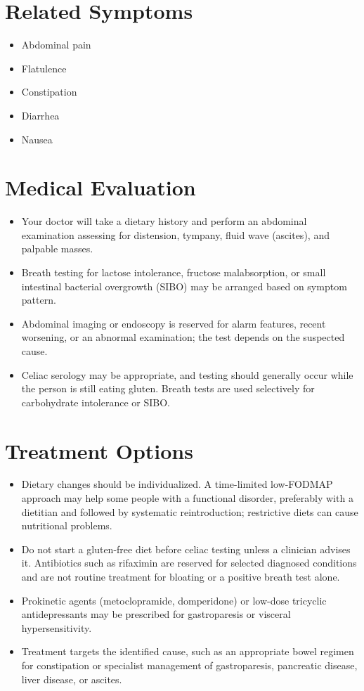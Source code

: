 \section*{Related Symptoms}
\begin{itemize}
 \item Abdominal pain
 \item Flatulence
 \item Constipation
 \item Diarrhea
 \item Nausea
\end{itemize}

\section*{Medical Evaluation}
\begin{itemize}
 \item Your doctor will take a dietary history and perform an abdominal examination assessing for distension, tympany, fluid wave (ascites), and palpable masses.
 \item Breath testing for lactose intolerance, fructose malabsorption, or small intestinal bacterial overgrowth (SIBO) may be arranged based on symptom pattern.
 \item Abdominal imaging or endoscopy is reserved for alarm features, recent worsening, or an abnormal examination; the test depends on the suspected cause.
 \item Celiac serology may be appropriate, and testing should generally occur while the person is still eating gluten. Breath tests are used selectively for carbohydrate intolerance or SIBO.
\end{itemize}

\section*{Treatment Options}
\begin{itemize}
 \item Dietary changes should be individualized. A time-limited low-FODMAP approach may help some people with a functional disorder, preferably with a dietitian and followed by systematic reintroduction; restrictive diets can cause nutritional problems.
 \item Do not start a gluten-free diet before celiac testing unless a clinician advises it. Antibiotics such as rifaximin are reserved for selected diagnosed conditions and are not routine treatment for bloating or a positive breath test alone.
 \item Prokinetic agents (metoclopramide, domperidone) or low-dose tricyclic antidepressants may be prescribed for gastroparesis or visceral hypersensitivity.
 \item Treatment targets the identified cause, such as an appropriate bowel regimen for constipation or specialist management of gastroparesis, pancreatic disease, liver disease, or ascites.
\end{itemize}

